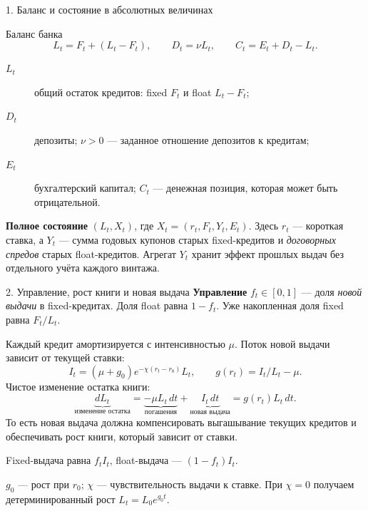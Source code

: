 \documentclass[aspectratio=169,11pt]{beamer}
\begin{document}
\begin{frame}{1. Баланс и состояние в абсолютных величинах}
\begin{block}{Баланс банка}
\[
L_t=F_t+(L_t-F_t),\qquad D_t=\nu L_t,\qquad C_t=E_t+D_t-L_t.
\]
\end{block}
\begin{description}
\item[$L_t$] общий остаток кредитов: fixed $F_t$ и float $L_t-F_t$;
\item[$D_t$] депозиты; $\nu>0$ --- заданное отношение депозитов к кредитам;
\item[$E_t$] бухгалтерский капитал; $C_t$ --- денежная позиция, которая может быть отрицательной.
\end{description}
\medskip
\textbf{Полное состояние} $(L_t,X_t)$, где $X_t=(r_t,F_t,Y_t,E_t)$.
Здесь $r_t$ --- короткая ставка, а $Y_t$ --- сумма годовых купонов
старых fixed-кредитов и \emph{договорных спредов} старых float-кредитов.
Агрегат $Y_t$ хранит эффект прошлых выдач без отдельного учёта каждого винтажа.
\end{frame}

\begin{frame}{2. Управление, рост книги и новая выдача}
\textbf{Управление} $f_t\in[0,1]$ --- доля \emph{новой выдачи} в fixed-кредитах.
Доля float равна $1-f_t$. Уже накопленная доля fixed равна $F_t/L_t$.
\medskip

Каждый кредит амортизируется с интенсивностью $\mu$.
Поток новой выдачи зависит от текущей ставки:
\[
I_t=(\mu+g_0)e^{-\chi(r_t-r_0)}L_t,
\qquad g(r_t)=I_t/L_t-\mu.
\]
Чистое изменение остатка книги:
\[
\underbrace{dL_t}_{\text{изменение остатка}}
=\underbrace{-\mu L_t\,dt}_{\text{погашения}}
+\underbrace{I_t\,dt}_{\text{новая выдача}}
=g(r_t)L_t\,dt.
\]
То есть новая выдача должна компенсировать выгашывание текущих кредитов и обеспечивать рост книги, который зависит от ставки.

Fixed-выдача равна $f_tI_t$, float-выдача --- $(1-f_t)I_t$.
\medskip

\footnotesize
$g_0$ --- рост при $r_0$; $\chi$ --- чувствительность выдачи к ставке.
При $\chi=0$ получаем детерминированный рост $L_t=L_0e^{g_0t}$.
\end{frame}
\end{document}
